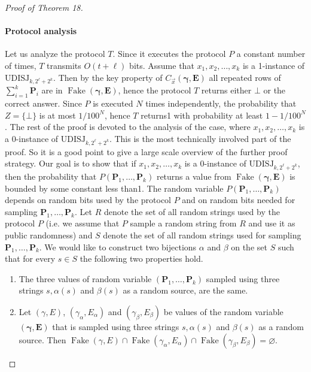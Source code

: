 \documentclass[10pt,a4paper]{article}
\begin{document}
\begin{proof}[Proof of Theorem 18]
\paragraph{Protocol analysis}
Let us analyze the protocol $T$. Since it executes the protocol $P$ a constant number of times, $T$ transmits $O(t+\ell)$ bits. Assume that $x_1,x_2,\ldots,x_k$ is a 1-instance of $\mathrm{UDISJ}_{k,2^\ell+2^k}$. Then by the key property of $C_{\vec x}(\boldsymbol\gamma,\mathbf E)$ all repeated rows of $\sum_{i=1}^k\mathbf P_i$ are in $\operatorname{Fake}(\boldsymbol\gamma,\mathbf E)$, hence the protocol $T$ returns either $\bot$ or the correct answer. Since $P$ is executed $N$ times independently, the probability that $Z=\{\bot\}$ is at most $1/100^N$, hence $T$ returns1 with probability at least $1-1/100^N$.
The rest of the proof is devoted to the analysis of the case, where $x_1,x_2,\ldots,x_k$ is a 0-instance of $\mathrm{UDISJ}_{k,2^\ell+2^k}$. This is the most technically involved part of the proof. So it is a good point to give a large scale overview of the further proof strategy. Our goal is to show that if $x_1,x_2,\ldots,x_k$ is a 0-instance of $\mathrm{UDISJ}_{k,2^\ell+2^k}$, then the probability that $P(\mathbf P_1,\ldots,\mathbf P_k)$ returns a value from $\operatorname{Fake}(\boldsymbol\gamma,\mathbf E)$ is bounded by some constant less than1.
The random variable $P(\mathbf P_1,\ldots,\mathbf P_k)$ depends on random bits used by the protocol $P$ and on random bits needed for sampling $\mathbf P_1,\ldots,\mathbf P_k$. Let $R$ denote the set of all random strings used by the protocol $P$ (i.e. we assume that $P$ sample a random string from $R$ and use it as public randomness) and $S$ denote the set of all random strings used for sampling $\mathbf P_1,\ldots,\mathbf P_k$. We would like to construct two bijections $\alpha$ and $\beta$ on the set $S$ such that for every $s\in S$ the following two properties hold.
\begin{enumerate}
\item The three values of random variable $(\mathbf P_1,\ldots,\mathbf P_k)$ sampled using three strings $s,\alpha(s)$ and $\beta(s)$ as a random source, are the same.
\item Let $(\gamma,E)$, $(\gamma_\alpha,E_\alpha)$ and $(\gamma_\beta,E_\beta)$ be values of the random variable $(\boldsymbol\gamma,\mathbf E)$ that is sampled using three strings $s,\alpha(s)$ and $\beta(s)$ as a random source. Then $\operatorname{Fake}(\gamma,E)\cap\operatorname{Fake}(\gamma_\alpha,E_\alpha)\cap\operatorname{Fake}(\gamma_\beta,E_\beta)=\varnothing$.

\end{enumerate}
\end{proof}
\end{document}
